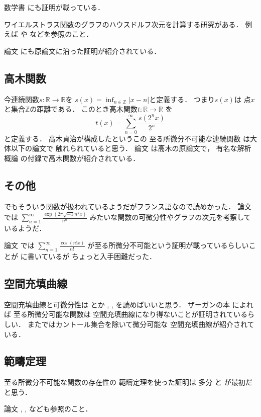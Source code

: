 \documentclass[leqno, a4paper, 12pt]{jsarticle}
\newcommand{\zz}{\mathbb{Z}}
\newcommand{\rr}{\mathbb{R}}
\begin{document}
数学書
\cite{MR3155290}
にも証明が載っている．


ワイエルストラス関数のグラフのハウスドルフ次元を計算する研究がある．
例えば
\cite{MR3558151}
や
\cite{MR1452806}
などを参照のこと．

論文
\cite{wa5}
にも原論文に沿った証明が紹介されている．


\subsection{高木関数}
今連続関数$s\colon \rr\to \rr$を
$s(x)=\inf_{n\in \zz}|x-n|$と定義する．
つまり$s(x)$は
点$x$と集合$\zz$の距離である．
このとき高木関数$t\colon \rr\to \rr$
を
\[
t(x)=\sum_{n=0}^{\infty}\frac{s(2^{n}x)}{2^{n}}
\]
と定義する．
高木貞治が構成したというこの
至る所微分不可能な連続関数
は大体以下の論文で
触れられていると思う．
論文\cite{Takagi1901}
は高木の原論文で，
有名な解析概論\cite{wa4}
の付録で高木関数が紹介されている．

\subsection{その他}
\cite{cellerier1890note}
でもそういう関数が扱われているようだがフランス語なので読めかった．
論文
\cite{MR1680194}
では
$\sum_{n=1}^{\infty}\frac{\exp(2\pi\sqrt{-1}n^{k}x)}{n^{\alpha}}$
みたいな関数の可微分性やグラフの次元を考察しているようだ．

論文
\cite{wa3}
では
$\sum_{n=1}^{\infty}\frac{\cos(n!x)}{n!}$
が至る所微分不可能という証明が載っているらしいことが
\cite{wa1}に書いているが
ちょっと入手困難だった．

\subsection{空間充填曲線}
空間充填曲線と可微分性は
\cite{wa6}
とか
\cite{MR1124993}, 
\cite{MR1160715}, 
\cite{MR1299533}
を読めばいいと思う．
ザーガンの本
\cite{wa6}によれば
至る所微分可能な関数は
空間充填曲線になり得ないことが証明されているらしい．
また\cite{wa6}ではカントール集合を除いて微分可能な
空間充填曲線が紹介されている．

\subsection{範疇定理}
至る所微分不可能な関数の存在性の
範疇定理を使った証明は
多分
\cite{Banach1931}
と
\cite{Mazurkiewicz1931}
が最初だと思う．

論文
\cite{Jarnik1933}, 
\cite{MR3391364}, 
\cite{MR0555048}
なども参照のこと．
\end{document}

